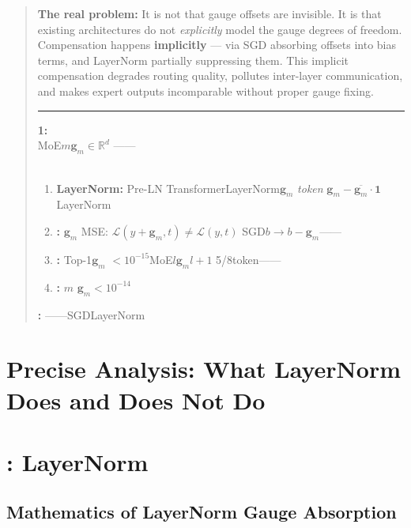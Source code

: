 \documentclass[11pt,a4paper]{article}
\newcommand{\R}{\mathbb{R}}
\newcommand{\gauge}{\mathbf{g}}
\begin{document}
\begin{quote}
{{\medskip
\textbf{The real problem:} It is not that gauge offsets are invisible. It is
that existing architectures do not \textit{explicitly} model the gauge degrees
of freedom. Compensation happens \textbf{implicitly} — via SGD absorbing offsets
into bias terms, and LayerNorm partially suppressing them. This implicit
compensation degrades routing quality, pollutes inter-layer communication,
and makes expert outputs incomparable without proper gauge fixing.

\medskip
\noindent\rule{\textwidth}{0.5pt}

\medskip
\textbf{1:}\\[6pt]
MoE$m$$\gauge_m \in \R^d$
\textbf{}——\\[4pt]
\textbf{}\textbf{}\\[4pt]
\begin{enumerate}
    \item \textbf{LayerNorm:} Pre-LN TransformerLayerNorm$\gauge_m$
    \textit{token}\textbf{}\textit{}
    $\gauge_m - \overline{\gauge_m}\cdot\mathbf{1}$
    \textbf{}LayerNorm

    \item \textbf{:} $\gauge_m$
    MSE: $\mathcal{L}(y + \gauge_m, t) \neq \mathcal{L}(y, t)$
    SGD$b \to b - \gauge_m$\textit{}——
    

    \item \textbf{:} Top-1$\gauge_m$\textbf{}
    $<10^{-15}$MoE$l$$\gauge_m$$l+1$
    5/8token\textbf{}——

    \item \textbf{:} $m$
    $\gauge_m$$<10^{-14}$
\end{enumerate}

\medskip
\textbf{:} \textit{}
\textit{}——SGDLayerNorm

}}
\end{quote}

\section{Precise Analysis: What LayerNorm Does and Does Not Do}
\section{: LayerNorm }

\subsection{Mathematics of LayerNorm Gauge Absorption}
\end{document}
